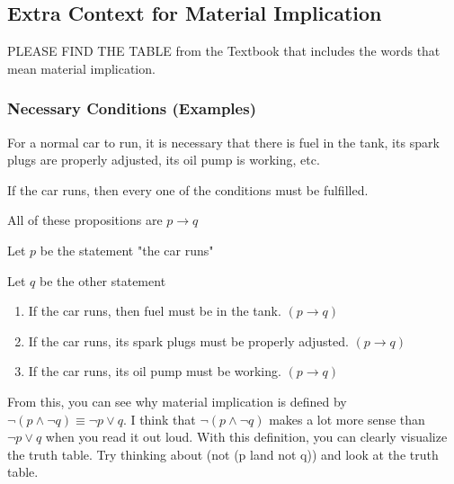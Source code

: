 \documentclass[12pt]{article}
\begin{document}
\subsection{Extra Context for Material Implication}

PLEASE FIND THE TABLE from the Textbook that includes the words that mean 
material implication.

\subsubsection{Necessary Conditions (Examples)}

For a normal car to run, it is necessary that there is fuel in the tank,
its spark plugs are properly adjusted, its oil pump is working, etc.

If the car runs, then every one of the conditions must be fulfilled.

All of these propositions are $p \to q$

Let $p$ be the statement "the car runs"

Let $q$ be the other statement

\begin{enumerate}
\item If the car runs, then fuel must be in the tank. $(p \to q)$
\item If the car runs, its spark plugs must be properly adjusted. $(p \to q)$
\item If the car runs, its oil pump must be working. $(p \to q)$
\end{enumerate}

From this, you can see why material implication is defined by 
$\neg (p \land \neg q) \equiv \neg p \lor q$. I think that $\neg (p \land \neg q)$
makes a lot more sense than $\neg p \lor q$ when you read it out loud. With
this definition, you can clearly visualize the truth table. Try thinking about
(not (p land not q)) and look at the truth table.

\end{document}
